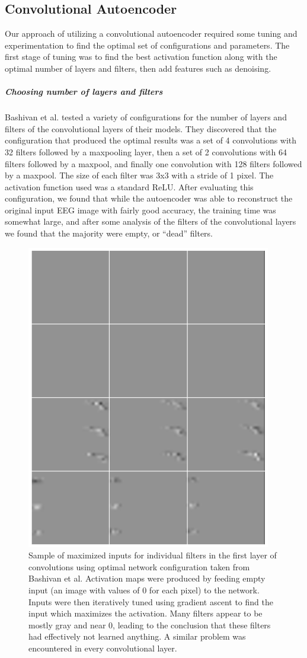 \documentclass{article}
\begin{document}
\subsection{Convolutional Autoencoder}
Our approach of utilizing a convolutional autoencoder required some tuning and experimentation to find the optimal set of configurations and parameters. The first stage of tuning was to find the best activation function along with the optimal number of layers and filters, then add features such as denoising.
\subparagraph{Choosing number of layers and filters}
Bashivan et al. tested a variety of configurations for the number of layers and filters of the convolutional layers of their models. They discovered that the configuration that produced the optimal results was a set of 4 convolutions with 32 filters followed by a maxpooling layer, then a set of 2 convolutions with 64 filters followed by a maxpool, and finally one convolution with 128 filters followed by a maxpool. The size of each filter was 3x3 with a stride of 1 pixel. The activation function used was a standard ReLU. After evaluating this configuration, we found that while the autoencoder was able to reconstruct the original input EEG image with fairly good accuracy, the training time was somewhat large, and after some analysis of the filters of the convolutional layers we found that the majority were empty, or “dead” filters. 
\begin{figure}
\includegraphics{inputs_orig}
\caption{Sample of maximized inputs for individual filters in the first layer of convolutions using optimal network configuration taken from Bashivan et al. Activation maps were produced by feeding empty input (an image with values of 0 for each pixel) to the network. Inputs were then iteratively tuned using gradient ascent to find the input which maximizes the activation. Many filters appear to be mostly gray and near 0, leading to the conclusion that these filters had effectively not learned anything. A similar problem was encountered in every convolutional layer.}
\end{figure}
\end{document}
